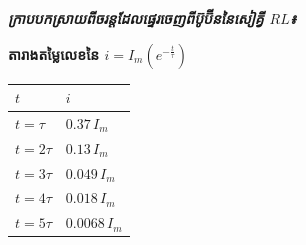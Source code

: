 \vspace{0.7em}
\noindent
\textbf{\textit{\textcolor{brownheader}{ក្រាបបកស្រាយពីចរន្តដែលផ្ទេរចេញពីប៊ូប៊ីននៃសៀគ្វី $RL$៖}}}

\vspace{0.4em}
\noindent
\begin{minipage}[t]{0.43\textwidth}
	\vspace{0pt}
	\centering
	{\small \textbf{តារាងតម្លៃលេខនៃ $i = I_m \left( e^{-\frac{t}{\tau}} \right)$}}

	\vspace{0.35em}
	\renewcommand{\arraystretch}{1.35}
	\setlength{\arrayrulewidth}{0.7pt}
	\begin{tabular}{|>{\centering\arraybackslash}m{2.1cm}|>{\centering\arraybackslash}m{2.3cm}|}
		\hline
		\rowcolor{rowhdr}
		\textcolor{brownheader}{\textbf{$t$}} & \textcolor{brownheader}{\textbf{$i$}} \\
		\hline
		$t = \tau$   & $0.37\,I_m$ \\
		\hline
		$t = 2\tau$  & $0.13\,I_m$ \\
		\hline
		$t = 3\tau$  & $0.049\,I_m$ \\
		\hline
		$t = 4\tau$  & $0.018\,I_m$ \\
		\hline
		$t = 5\tau$  & $0.0068\,I_m$ \\
		\hline
	\end{tabular}
\end{minipage}%
\hfill
